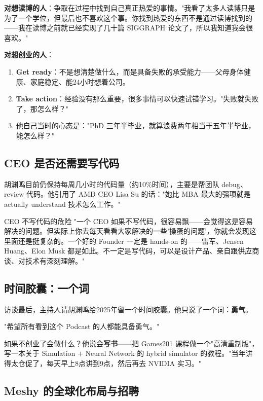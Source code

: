 \documentclass[a4paper]{article}
\begin{document}
\textbf{对想读博的人}：争取在过程中找到自己真正热爱的事情。"我看了太多人读博只是为了一个学位，但最后也不喜欢这个事。你找到热爱的东西不是通过读博找到的——我在读博之前就已经实现了几十篇 SIGGRAPH 论文了，所以我知道我会很喜欢。"

\textbf{对想创业的人}：
\begin{enumerate}
\item \textbf{Get ready}：不是想清楚做什么，而是具备失败的承受能力——父母身体健康、家庭稳定、能24小时想着公司。
\item \textbf{Take action}：经验没有那么重要，很多事情可以快速试错学习。"失败就失败了，那怎么样？"
\item 他自己当时的心态是："PhD 三年半毕业，就算浪费两年相当于五年半毕业，能怎么样？"
\end{enumerate}

\subsection{CEO 是否还需要写代码}

胡渊鸣目前仍保持每周几小时的代码量（约10\%时间），主要是帮团队 debug、review 代码。他引用了 AMD CEO Lisa Su 的话："她比 MBA 最大的强项就是 actually understand 技术怎么工作。"

\begin{warningbox}{CEO 不写代码的危险}
"一个 CEO 如果不写代码，很容易飘——会觉得这是容易解决的问题。但实际上你去每天看看大家解决的一些'操蛋的问题'，你就会发现这里面还是挺复杂的。一个好的 Founder 一定是 hands-on 的——雷军、Jensen Huang、Elon Musk 都是如此。不一定是写代码，可以是设计产品、亲自跟供应商谈、对技术有深刻理解。"
\end{warningbox}

\subsection{时间胶囊：一个词}

访谈最后，主持人请胡渊鸣给2025年留一个时间胶囊。他只说了一个词：\textbf{勇气}。

"希望所有看到这个 Podcast 的人都能具备勇气。"

如果不创业了会做什么？他说会\textbf{写书}——把 Games201 课程做一个"高清重制版"，写一本关于 Simulation + Neural Network 的 hybrid simulator 的教程。"当年讲得太仓促了，每天早上8点讲到9点，然后再去 NVIDIA 实习。"

\subsection{Meshy 的全球化布局与招聘}
\end{document}
